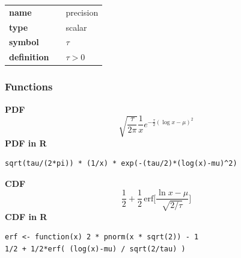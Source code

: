 \noindent\begin{tabular}{p{2cm}cl}
\textbf{name} & & precision \\
\textbf{type} & & scalar \\
\textbf{symbol} & & $\tau$  \\
\textbf{definition} & & $\tau > 0$
\end{tabular}
\subsubsection*{Functions}

\smallskip \noindent \hspace{.2cm} \textbf{PDF} 
\begin{equation*}\sqrt{\frac{\tau}{2 \pi}} \frac{1}{x}e^{-\frac{\tau}{2}(\log x-\mu)^2}\end{equation*}
\smallskip \noindent \hspace{.2cm} \textbf{PDF in R}  
\begin{verbatim}sqrt(tau/(2*pi)) * (1/x) * exp(-(tau/2)*(log(x)-mu)^2)\end{verbatim}
\smallskip \noindent \hspace{.2cm} \textbf{CDF} 
\begin{equation*}\frac12 + \frac12\,\text{erf}\Big[\frac{\ln x-\mu}{\sqrt{2/\tau}}\Big]\end{equation*}
\smallskip \noindent \hspace{.2cm} \textbf{CDF in R}  
\begin{verbatim}
erf <- function(x) 2 * pnorm(x * sqrt(2)) - 1
1/2 + 1/2*erf( (log(x)-mu) / sqrt(2/tau) )\end{verbatim}

